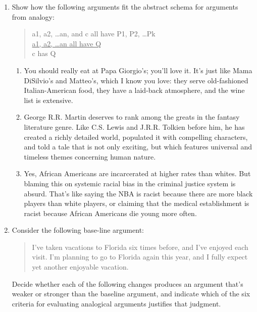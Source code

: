 \begin{enumerate}
\item Show how the following arguments fit the abstract schema for arguments from analogy:

\begin{quote}
a1, a2, \dots an, and c all have P1, P2, \dots Pk \\
\underline{a1, a2, \dots an all have Q} \\
c has Q \\
\end{quote}


\begin{enumerate}
\item You should really eat at Papa Giorgio's; you'll love it. It's just like Mama DiSilvio's
and Matteo's, which I know you love: they serve old-fashioned Italian-American food,
they have a laid-back atmosphere, and the wine list is extensive.
\item George R.R. Martin deserves to rank among the greats in the fantasy literature genre.
Like C.S. Lewis and J.R.R. Tolkien before him, he has created a richly detailed world,
populated it with compelling characters, and told a tale that is not only exciting, but which
features universal and timeless themes concerning human nature.
\item Yes, African Americans are incarcerated at higher rates than whites. But blaming this
on systemic racial bias in the criminal justice system is absurd. That's like saying the NBA
is racist because there are more black players than white players, or claiming that the
medical establishment is racist because African Americans die young more often.
\end{enumerate}
\item Consider the following base-line argument:

\begin{quote}I've taken vacations to Florida six times before, and I've enjoyed each visit. I'm planning
to go to Florida again this year, and I fully expect yet another enjoyable vacation.
\end{quote}

Decide whether each of the following changes produces an argument that's weaker or stronger
than the baseline argument, and indicate which of the six criteria for evaluating analogical
arguments justifies that judgment.


\end{enumerate}
